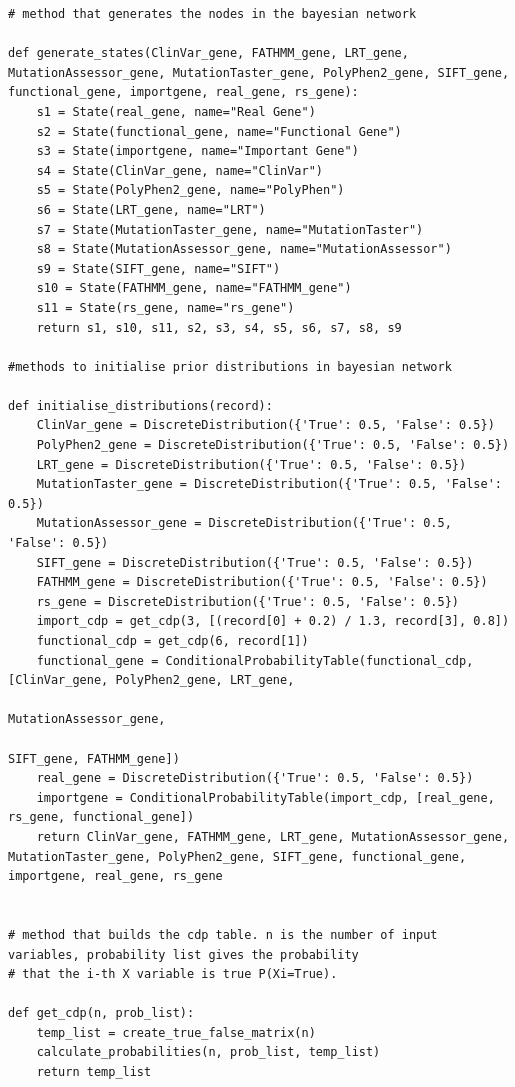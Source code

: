 \documentclass{article}
\begin{document}
\begin{verbatim}
# method that generates the nodes in the bayesian network

def generate_states(ClinVar_gene, FATHMM_gene, LRT_gene, MutationAssessor_gene, MutationTaster_gene, PolyPhen2_gene, SIFT_gene, functional_gene, importgene, real_gene, rs_gene):
    s1 = State(real_gene, name="Real Gene")
    s2 = State(functional_gene, name="Functional Gene")
    s3 = State(importgene, name="Important Gene")
    s4 = State(ClinVar_gene, name="ClinVar")
    s5 = State(PolyPhen2_gene, name="PolyPhen")
    s6 = State(LRT_gene, name="LRT")
    s7 = State(MutationTaster_gene, name="MutationTaster")
    s8 = State(MutationAssessor_gene, name="MutationAssessor")
    s9 = State(SIFT_gene, name="SIFT")
    s10 = State(FATHMM_gene, name="FATHMM_gene")
    s11 = State(rs_gene, name="rs_gene")
    return s1, s10, s11, s2, s3, s4, s5, s6, s7, s8, s9

#methods to initialise prior distributions in bayesian network

def initialise_distributions(record):
    ClinVar_gene = DiscreteDistribution({'True': 0.5, 'False': 0.5})
    PolyPhen2_gene = DiscreteDistribution({'True': 0.5, 'False': 0.5})
    LRT_gene = DiscreteDistribution({'True': 0.5, 'False': 0.5})
    MutationTaster_gene = DiscreteDistribution({'True': 0.5, 'False': 0.5})
    MutationAssessor_gene = DiscreteDistribution({'True': 0.5, 'False': 0.5})
    SIFT_gene = DiscreteDistribution({'True': 0.5, 'False': 0.5})
    FATHMM_gene = DiscreteDistribution({'True': 0.5, 'False': 0.5})
    rs_gene = DiscreteDistribution({'True': 0.5, 'False': 0.5})
    import_cdp = get_cdp(3, [(record[0] + 0.2) / 1.3, record[3], 0.8])
    functional_cdp = get_cdp(6, record[1])
    functional_gene = ConditionalProbabilityTable(functional_cdp, [ClinVar_gene, PolyPhen2_gene, LRT_gene,
                                                                   MutationAssessor_gene,
                                                                   SIFT_gene, FATHMM_gene])
    real_gene = DiscreteDistribution({'True': 0.5, 'False': 0.5})
    importgene = ConditionalProbabilityTable(import_cdp, [real_gene, rs_gene, functional_gene])
    return ClinVar_gene, FATHMM_gene, LRT_gene, MutationAssessor_gene, MutationTaster_gene, PolyPhen2_gene, SIFT_gene, functional_gene, importgene, real_gene, rs_gene


# method that builds the cdp table. n is the number of input variables, probability list gives the probability
# that the i-th X variable is true P(Xi=True).

def get_cdp(n, prob_list):
    temp_list = create_true_false_matrix(n)
    calculate_probabilities(n, prob_list, temp_list)
    return temp_list



\end{verbatim}
\end{document}

